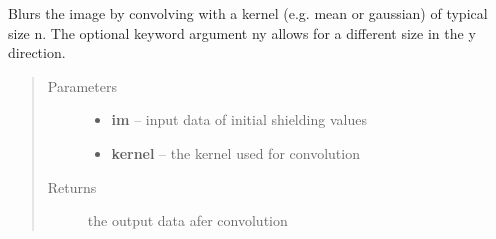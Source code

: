 \documentclass[letterpaper,10pt,english]{sphinxmanual}
\begin{document}

\begin{fulllineitems}
\label{docs/shielding:shield_mult.blur_image}
Blurs the image by convolving with a kernel (e.g. mean or gaussian) of
typical size n. The optional keyword argument ny allows for a different
size in the y direction.
\begin{quote}\begin{description}
\item[{Parameters}] \leavevmode\begin{itemize}
\item {} 
\textbf{im} --  input data of initial shielding values

\item {} 
\textbf{kernel} --  the kernel used for convolution

\end{itemize}

\item[{Returns}] \leavevmode
{} the output data afer convolution

\end{description}\end{quote}

\end{fulllineitems}


\end{document}
